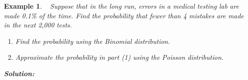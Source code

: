\documentclass[12pt]{amsart}
\newtheorem{example}[theorem]{Example}
\begin{document}
{%
\newpage
\begin{example}\ %
Suppose that in the long run, errors in a medical testing lab are made 0.1\% of the time. Find the probability that fewer than 4 mistakes are made in the next 2,000 tests.

\begin{enumerate}
\item Find the probability using the Binomial distribution.
\item Approximate the probability in part (1) using the Poisson distribution.
\end{enumerate}
\textbf{Solution:}

\end{example}



}  %
\end{document}
